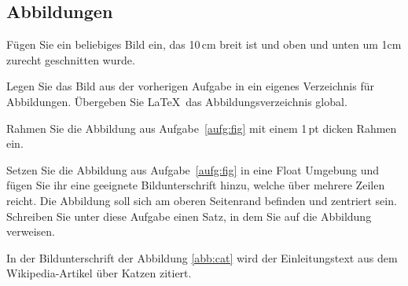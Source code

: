 \subsection{Abbildungen}
\pagecolor{white}
\begin{aufgabe}\label{aufg:fig} \label{aufg:22}
F\"ugen Sie ein beliebiges Bild ein, das 10\,cm breit ist und oben und unten um 1cm zurecht geschnitten wurde. 
\end{aufgabe}


\begin{aufgabe}
\label{aufg:23}
Legen Sie das Bild aus der vorherigen Aufgabe in ein eigenes Verzeichnis f\"ur Abbildungen. \"Ubergeben Sie \LaTeX\ das Abbildungsverzeichnis global.	
\end{aufgabe}

\begin{aufgabe}
\label{aufg:24}
Rahmen Sie die Abbildung aus Aufgabe~\ref{aufg:fig} mit einem 1\,pt dicken Rahmen ein.
\end{aufgabe}

\begin{aufgabe}
\label{aufg:25}
Setzen Sie die Abbildung aus Aufgabe~\ref{aufg:fig} in eine Float Umgebung und f\"ugen Sie ihr eine geeignete Bildunterschrift hinzu, welche \"uber mehrere Zeilen reicht. Die Abbildung soll sich am oberen Seitenrand befinden und zentriert sein. Schreiben Sie unter diese Aufgabe einen Satz, in dem Sie auf die Abbildung verweisen.	
\end{aufgabe}
\FloatBarrier			%
In der Bildunterschrift der Abbildung \ref{abb:cat} wird der Einleitungstext aus dem Wikipedia-Artikel über Katzen zitiert.

